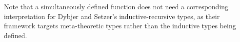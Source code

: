 \documentclass[a4paper,UKenglish,numberwithinsect,cleveref,thm-restate]{lipics-v2021}
\begin{document}


\begin{remark} \label{re:method-recursion-IIR}
Note that a simultaneously defined function does not need a corresponding interpretation for Dybjer and Setzer's inductive-recursive types, as their framework targets meta-theoretic types rather than the inductive types being defined.
\end{remark}
\end{document}

